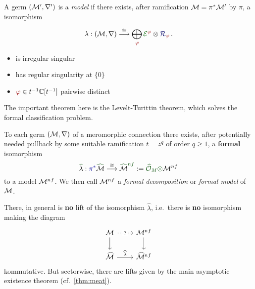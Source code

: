 \begin{defn}\label{defn:model}
  \def\myPhi{\textcolor{red!60!black}{\phi}}
  \def\myE{\textcolor{green!40!black}{\cE^{\myPhi}}}
  A germ $(\mathcal{M}',\nabla')$ is a \emph{model} if there exists, after ramification
  $\mathcal{M}=\pi^*\mathcal{M}'$ by $\pi$, a isomorphism
  \begin{multicols}{2}
    \[
      \lambda:(\cM,\nabla)
      \overset{\cong}{\longrightarrow}
      \bigoplus_{~\tikzmark{e3}\!\!\myPhi}
      \overset{\tikzmark{e2}}{\myE}
      \otimes
      \overset{\tikzmark{e1}}{\textcolor{blue!40!black}{\cR_{\myPhi}}}
      \,.
    \]
    \columnbreak{}
    \begin{itemize}
      \item[\tikzmarkb{n2}{green}] is irregular singular
      \item[\tikzmarkc{n1}{blue}] has regular singularity at $\{0\}$
      \item[\tikzmarkc{n3}{red}] $\myPhi\in t^{-1}\C[t^{-1}]$ pairwise distinct
    \end{itemize}
  \end{multicols}
\end{defn}
The important theorem here is the Levelt-Turittin theorem, which solves the
formal classification problem.
\begin{thm}\label{thm:leveltTurittin}
  To each germ $(\mathcal{M},\nabla)$ of a meromorphic connection there exists, after
  potentially needed \textcolor{blue!60!black}{pullback by some suitable
  ramification $t=z^q$ of order $q\geq1$}, a
  \textcolor{green!30!black}{\textbf{formal}} isomorphism
  \[
    \textcolor{green!30!black}{\hat{\textcolor{black}{\lambda}}}:
    \textcolor{blue!60!black}{\pi^{*}}
    \textcolor{green!30!black}{\hat{\textcolor{black}{\cM}}}
    \overset{\cong}\longrightarrow
    \textcolor{green!30!black}{\hat{\textcolor{black}{\cM}}^{nf}}
    :=\textcolor{green!30!black}{\hat\cO_M\otimes}\cM^{nf}
  \]
  to a model $\mathcal{M}^{nf}$.
  We then call $\mathcal{M}^{nf}$ a \emph{formal decomposition} or \emph{formal model}
  of $\mathcal{M}$.
  \begin{rem}
    There, in general is \textbf{no} lift of the isomorphism $\hat\lambda$,
    i.e.\ there is \textbf{no} isomorphism making the diagram
    \[ \begin{tikzcd}
        \cM \dar \arrow[dotted]{r}[description]{?} & \cM^{nf} \dar
        \\\hat\cM \rar{\hat\lambda} & \hat\cM^{nf}
    \end{tikzcd} \]
    kommutative. But sectorwise, there are lifts given by the main asymptotic
    existence theorem (cf.\ \ref{thm:meat}).
  \end{rem}
\end{thm}
